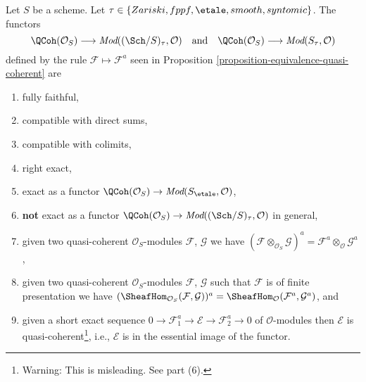 \begin{lemma}
\label{lemma-equivalence-quasi-coherent-limits}
Let $S$ be a scheme.
Let $\tau \in \{Zariski, \linebreak[0] fppf, \linebreak[0]
\etale, \linebreak[0] smooth, \linebreak[0] syntomic\}$.
The functors
$$
\QCoh(\mathcal{O}_S)
\longrightarrow
\textit{Mod}((\Sch/S)_\tau, \mathcal{O})
\quad\text{and}\quad
\QCoh(\mathcal{O}_S)
\longrightarrow
\textit{Mod}(S_\tau, \mathcal{O})
$$
defined by the rule $\mathcal{F} \mapsto \mathcal{F}^a$ seen in
Proposition \ref{proposition-equivalence-quasi-coherent}
are
\begin{enumerate}
\item fully faithful,
\item compatible with direct sums,
\item compatible with colimits,
\item right exact,
\item exact as a functor
$\QCoh(\mathcal{O}_S) \to \textit{Mod}(S_\etale, \mathcal{O})$,
\item {\bf not} exact as a functor
$\QCoh(\mathcal{O}_S) \to
\textit{Mod}((\Sch/S)_\tau, \mathcal{O})$
in general,
\item given two quasi-coherent $\mathcal{O}_S$-modules
$\mathcal{F}$, $\mathcal{G}$ we have
$(\mathcal{F} \otimes_{\mathcal{O}_S} \mathcal{G})^a =
\mathcal{F}^a \otimes_\mathcal{O} \mathcal{G}^a$,
\item given two quasi-coherent $\mathcal{O}_S$-modules
$\mathcal{F}$, $\mathcal{G}$ such that $\mathcal{F}$
is of finite presentation we have
$(\SheafHom_{\mathcal{O}_S}(\mathcal{F}, \mathcal{G}))^a =
\SheafHom_\mathcal{O}(\mathcal{F}^a, \mathcal{G}^a)$, and
\item given a short exact sequence
$0 \to \mathcal{F}_1^a \to \mathcal{E} \to \mathcal{F}_2^a \to 0$
of $\mathcal{O}$-modules then $\mathcal{E}$ is
quasi-coherent\footnote{Warning: This is misleading. See part (6).}, i.e.,
$\mathcal{E}$ is in the essential image of the functor.
\end{enumerate}
\end{lemma}

